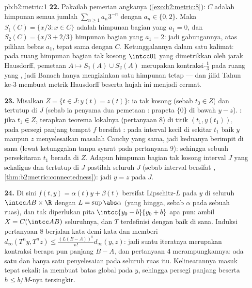 \begin{solution}{pb:b2:metric:1}
\textbf{22.} Pakailah pemerian angkanya
(\cref{exo:b2:metric:8}): $C$ adalah himpunan semua jumlah
$\sum_{n\geq1}a_n3^{-n}$ dengan $a_n \in \{0, 2\}$. Maka $S_1(C) =
\{x/3 : x \in C\}$ adalah himpunan bagian yang $a_1 = 0$, dan $S_2(C) =
\{x/3 + 2/3\}$ himpunan bagian yang $a_1 = 2$: jadi gabungannya, atas
pilihan bebas $a_1$, tepat sama dengan $C$. Ketunggalannya dalam satu
kalimat: pada ruang himpunan bagian  tak kosong
$\intcc01$ yang dimetrikkan oleh jarak Hausdorff, pemetaan $A \mapsto
S_1(A) \cup S_2(A)$ merupakan kontraksi-$\frac13$ pada ruang yang
, jadi Banach hanya mengizinkan satu himpunan tetap --- dan jilid
Tahun ke-3 membuat metrik Hausdorff beserta hujah ini menjadi cermat.

\textbf{23.} Misalkan $Z = \{t \in J : y(t) = z(t)\}$: ia tak kosong
(sebab $t_0 \in Z$) dan tertutup di $J$ (sebab ia penyama dua pemetaan
: prapeta $\{0\}$ di bawah $y - z$). : jika $t_1 \in Z$,
terapkan teorema lokalnya (pertanyaan 8) di titik $(t_1, y(t_1))$,
pada persegi panjang tempat $f$ bersifat : pada interval kecil
di sekitar $t_1$ baik $y$ maupun $z$ menyelesaikan masalah Cauchy yang
sama, jadi keduanya berimpit di sana (lewat ketunggalan tanpa syarat pada
pertanyaan 9): sehingga sebuah persekitaran $t_1$ berada di $Z$. Adapun
himpunan bagian tak kosong interval $J$ yang sekaligus  dan
tertutup di $J$ pastilah seluruh $J$ (sebab interval bersifat ,
\cref{thm:b2:metric:connectedness}): jadi $y = z$ pada $J$.

\textbf{24.} Di sini $f(t, y) = \alpha(t)y + \beta(t)$ bersifat
Lipschitz-$L$ pada $y$ di seluruh $\intcc AB \times \R$ dengan $L =
\sup\abs\alpha$ (yang hingga, sebab $\alpha$  pada sebuah ruas),
dan tak diperlukan pita $\intcc{y_0 - b}{y_0 + b}$ apa pun: ambil $X =
C(\intcc AB)$ seluruhnya, dan $T$ terdefinisi dengan baik di sana.
Induksi pertanyaan 8 berjalan kata demi kata dan memberi
$d_\infty(T^ny, T^nz) \leq \frac{(L(B - A))^n}{n!}d_\infty(y, z)$: jadi
suatu iteratnya merupakan kontraksi berapa pun panjang $B - A$, dan
pertanyaan 4 merampungkannya: ada satu dan hanya satu penyelesaian pada
seluruh ruas itu. Kelinearannya masuk tepat sekali: ia membuat batas
 global pada $y$, sehingga persegi panjang beserta $h \leq
b/M$-nya tersingkir.


\end{solution}
